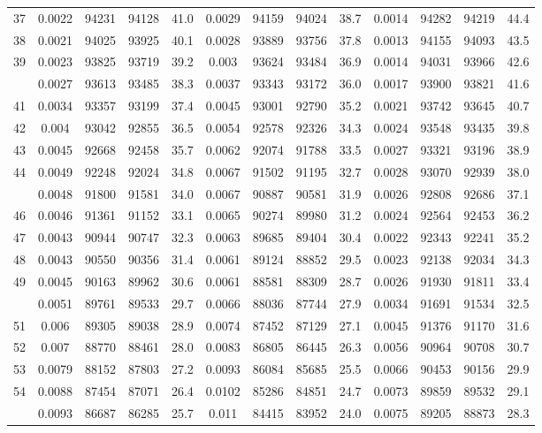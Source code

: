 \documentclass[
  14pt,
]{article}
\begin{document}
\begin{longtable}[t]{lcccccccccccc}
37 & 0.0022 & 94231 & 94128 & 41.0 & 0.0029 & 94159 & 94024 & 38.7 & 0.0014 & 94282 & 94219 & 44.4\\
38 & 0.0021 & 94025 & 93925 & 40.1 & 0.0028 & 93889 & 93756 & 37.8 & 0.0013 & 94155 & 94093 & 43.5\\
39 & 0.0023 & 93825 & 93719 & 39.2 & 0.003 & 93624 & 93484 & 36.9 & 0.0014 & 94031 & 93966 & 42.6\\
\addlinespace
40 & 0.0027 & 93613 & 93485 & 38.3 & 0.0037 & 93343 & 93172 & 36.0 & 0.0017 & 93900 & 93821 & 41.6\\
41 & 0.0034 & 93357 & 93199 & 37.4 & 0.0045 & 93001 & 92790 & 35.2 & 0.0021 & 93742 & 93645 & 40.7\\
42 & 0.004 & 93042 & 92855 & 36.5 & 0.0054 & 92578 & 92326 & 34.3 & 0.0024 & 93548 & 93435 & 39.8\\
43 & 0.0045 & 92668 & 92458 & 35.7 & 0.0062 & 92074 & 91788 & 33.5 & 0.0027 & 93321 & 93196 & 38.9\\
44 & 0.0049 & 92248 & 92024 & 34.8 & 0.0067 & 91502 & 91195 & 32.7 & 0.0028 & 93070 & 92939 & 38.0\\
\addlinespace
45 & 0.0048 & 91800 & 91581 & 34.0 & 0.0067 & 90887 & 90581 & 31.9 & 0.0026 & 92808 & 92686 & 37.1\\
46 & 0.0046 & 91361 & 91152 & 33.1 & 0.0065 & 90274 & 89980 & 31.2 & 0.0024 & 92564 & 92453 & 36.2\\
47 & 0.0043 & 90944 & 90747 & 32.3 & 0.0063 & 89685 & 89404 & 30.4 & 0.0022 & 92343 & 92241 & 35.2\\
48 & 0.0043 & 90550 & 90356 & 31.4 & 0.0061 & 89124 & 88852 & 29.5 & 0.0023 & 92138 & 92034 & 34.3\\
49 & 0.0045 & 90163 & 89962 & 30.6 & 0.0061 & 88581 & 88309 & 28.7 & 0.0026 & 91930 & 91811 & 33.4\\
\addlinespace
50 & 0.0051 & 89761 & 89533 & 29.7 & 0.0066 & 88036 & 87744 & 27.9 & 0.0034 & 91691 & 91534 & 32.5\\
51 & 0.006 & 89305 & 89038 & 28.9 & 0.0074 & 87452 & 87129 & 27.1 & 0.0045 & 91376 & 91170 & 31.6\\
52 & 0.007 & 88770 & 88461 & 28.0 & 0.0083 & 86805 & 86445 & 26.3 & 0.0056 & 90964 & 90708 & 30.7\\
53 & 0.0079 & 88152 & 87803 & 27.2 & 0.0093 & 86084 & 85685 & 25.5 & 0.0066 & 90453 & 90156 & 29.9\\
54 & 0.0088 & 87454 & 87071 & 26.4 & 0.0102 & 85286 & 84851 & 24.7 & 0.0073 & 89859 & 89532 & 29.1\\
\addlinespace
55 & 0.0093 & 86687 & 86285 & 25.7 & 0.011 & 84415 & 83952 & 24.0 & 0.0075 & 89205 & 88873 & 28.3\\

\end{longtable}
\end{document}
